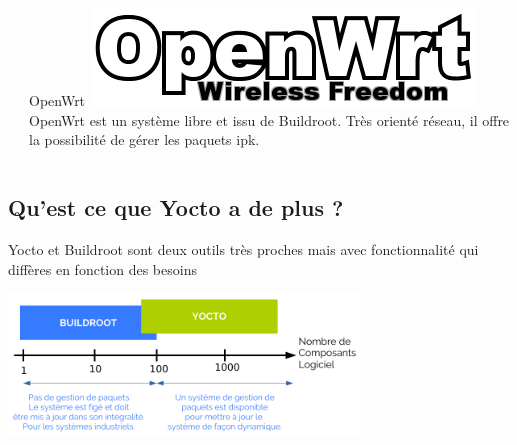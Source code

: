 \documentclass[compress]{smilebeamer}
\begin{document}
\begin{frame}
\begin{columns}[t]
\begin{column}{0.33\textwidth}
	\end{column}
	\begin{column}{0.33\textwidth}
	\begin{exampleblock}{OpenWrt}
		\includegraphics[width=\textwidth]{logos/OpenWrt.png}
		\newline
		\newline
		\newline
		OpenWrt est un système libre et issu de Buildroot. Très orienté réseau, il offre la possibilité de gérer les paquets ipk.
	\end{exampleblock}   
	\end{column}
\end{columns} 
\end{frame}

%
%
\subsection{Qu'est ce que Yocto a de plus ?}

\begin{frame}
	Yocto et Buildroot sont deux outils très proches mais avec fonctionnalité qui diffères en fonction des besoins
	\begin{center}
	\includegraphics[width=0.7\textwidth]{schemas/buildroot_vs_yocto.png}	
	\end{center}
\end{frame}
\end{document}

